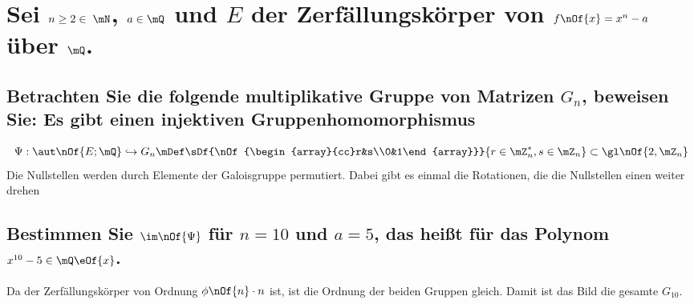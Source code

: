 \section{Sei $n\geq 2 \in\;\mN$, $a\in\mQ$ und $E$ der Zerfällungskörper von $f\nOf{x}=x^n-a$ über $\mQ$.}
\subsection{Betrachten Sie die folgende multiplikative Gruppe von Matrizen $G_n$, beweisen Sie: Es gibt einen injektiven Gruppenhomomorphismus}
\begin{equation}
	\Psi:\aut\nOf{E;\mQ} \hookrightarrow G_n\mDef\sDf{\nOf{\begin{array}{cc}r&s\\0&1\end{array}}}{r\in\mZ^*_n,s\in\mZ_n}\subset\gl\nOf{2,\mZ_n}
\end{equation}
Die Nullstellen werden durch Elemente der Galoisgruppe permutiert. Dabei gibt es einmal die Rotationen, die die Nullstellen einen weiter drehen

\subsection{Bestimmen Sie $\im\nOf{\Psi}$ für $n=10$ und $a=5$, das heißt für das Polynom $x^{10}-5\in\mQ\eOf{x}$.}
Da der Zerfällungskörper von Ordnung $\phi\nOf{n}\cdot n$ ist, ist die Ordnung der beiden Gruppen gleich. Damit ist das Bild die gesamte $G_10$.
